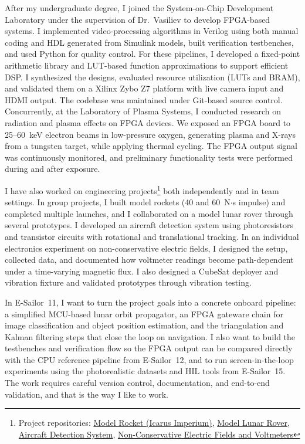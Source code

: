 \documentclass[a4paper,12pt]{article}
\begin{document}
After my undergraduate degree, I joined the System-on-Chip Development Laboratory under the supervision of Dr.\ Vasiliev to develop FPGA-based systems. I implemented video-processing algorithms in Verilog using both manual coding and HDL generated from Simulink models, built verification testbenches, and used Python for quality control. For these pipelines, I developed a fixed-point arithmetic library and LUT-based function approximations to support efficient DSP. I synthesized the designs, evaluated resource utilization (LUTs and BRAM), and validated them on a Xilinx Zybo Z7 platform with live camera input and HDMI output. The codebase was maintained under Git-based source control. Concurrently, at the Laboratory of Plasma Systems, I conducted research on radiation and plasma effects on FPGA devices. We exposed an FPGA board to 25--60~keV electron beams in low-pressure oxygen, generating plasma and X-rays from a tungsten target, while applying thermal cycling. The FPGA output signal was continuously monitored, and preliminary functionality tests were performed during and after exposure.

I have also worked on engineering projects\footnote{Project repositories: \href{https://github.com/icarus-imperium/rocket-2025}{Model Rocket (Icarus Imperium)}, \href{https://github.com/rezaaliasgarirenani/Rover}{Model Lunar Rover}, \href{https://github.com/rezaaliasgarirenani/Aircraft-Detection-System}{Aircraft Detection System}, \href{https://github.com/rezaaliasgarirenani/Non-Conservative-Electric-Fields-and-Voltmeters}{Non-Conservative Electric Fields and Voltmeters}} both independently and in team settings. In group projects, I built model rockets (40 and 60~N$\cdot$s impulse) and completed multiple launches, and I collaborated on a model lunar rover through several prototypes. I developed an aircraft detection system using photoresistors and transistor circuits with rotational and translational tracking. In an individual electronics experiment on non-conservative electric fields, I designed the setup, collected data, and documented how voltmeter readings become path-dependent under a time-varying magnetic flux. I also designed a CubeSat deployer and vibration fixture and validated prototypes through vibration testing.

In E-Sailor~11, I want to turn the project goals into a concrete onboard pipeline: a simplified MCU-based lunar orbit propagator, an FPGA gateware chain for image classification and object position estimation, and the triangulation and Kalman filtering steps that close the loop on navigation. I also want to build the testbenches and verification flow so the FPGA output can be compared directly with the CPU reference pipeline from E-Sailor~12, and to run screen-in-the-loop experiments using the photorealistic datasets and HIL tools from E-Sailor~15. The work requires careful version control, documentation, and end-to-end validation, and that is the way I like to work.
\end{document}
